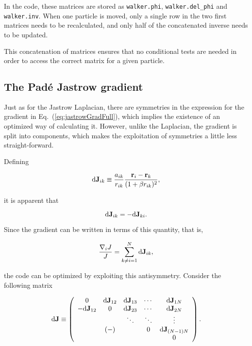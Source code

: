 In the code, these matrices are stored as \verb+walker.phi+, \verb+walker.del_phi+ and \verb+walker.inv+. When one particle is moved, only a single row in the two first matrices needs to be recalculated, and only half of the concatenated inverse needs to be updated.

This concatenation of matrices ensures that no conditional tests are needed in order to access the correct matrix for a given particle. 

\subsection{The Padé Jastrow gradient}
\label{sec:optJastGrad}

Just as for the Jastrow Laplacian, there are symmetries in the expression for the gradient in Eq.~(\ref{eq:jastrowGradFull}), which implies the existence of an optimized way of calculating it. However, unlike the Laplacian, the gradient is split into components, which makes the exploitation of symmetries a little less straight-forward. 

Defining

\begin{equation}
 \mathrm{d}\mathbf{J}_{ik}  \equiv \frac{a_{ik}}{r_{ik}}\frac{\mathbf{r}_i -  \mathbf{r}_k}{(1 + \beta r_{ik})^2},
\end{equation}

it is apparent that 

\begin{equation}
 \mathrm{d}\mathbf{J}_{ik} = -\mathrm{d}\mathbf{J}_{ki}.
\end{equation}

Since the gradient can be written in terms of this quantity, that is,

\begin{equation}
 \frac{\nabla_i J}{J} = \sum_{k \ne i = 1}^N \mathrm{d}\mathbf{J}_{ik},
\end{equation}

the code can be optimized by exploiting this antisymmetry. Consider the following matrix

\begin{equation}
\label{eq:jastrowDJ}
 \mathbf{\mathrm{d}J}\equiv \left( \begin{array}{ccccc}
0 & \mathrm{d}\mathbf{J}_{12} & \mathrm{d}\mathbf{J}_{13} & \cdots & \mathrm{d}\mathbf{J}_{1N} \\
 -\mathrm{d}\mathbf{J}_{12} & 0 & \mathrm{d}\mathbf{J}_{23} & \cdots & \mathrm{d}\mathbf{J}_{2N}  \\
 &  & \ddots & \ddots & \vdots \\
 & (-) &  & 0 & \mathrm{d}\mathbf{J}_{(N-1)N} \\
 &  &  &  & 0\end{array} \right).
\end{equation}


